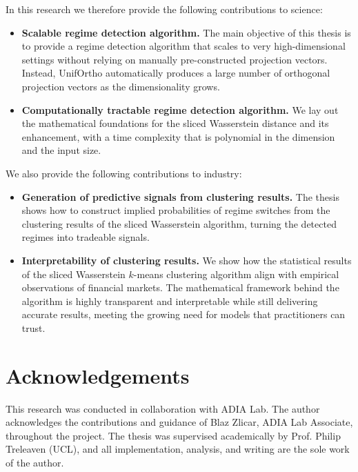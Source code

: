 \documentclass[12pt,a4paper]{report}
\begin{document}
In this research we therefore provide the following contributions to science:
\begin{itemize}
  \item \textbf{Scalable regime detection algorithm.} The main objective of this
  thesis is to provide a regime detection algorithm that scales to very
  high-dimensional settings without relying on manually pre-constructed projection
  vectors. Instead, UnifOrtho automatically produces a large number of orthogonal
  projection vectors as the dimensionality grows.

  \item \textbf{Computationally tractable regime detection algorithm.} We lay out
  the mathematical foundations for the sliced Wasserstein distance and its
  enhancement, with a time complexity that is polynomial in the dimension and the
  input size.
\end{itemize}

We also provide the following contributions to industry:
\begin{itemize}
  \item \textbf{Generation of predictive signals from clustering results.} The
  thesis shows how to construct implied probabilities of regime switches from the
  clustering results of the sliced Wasserstein algorithm, turning the detected
  regimes into tradeable signals.

  \item \textbf{Interpretability of clustering results.} We show how the statistical
  results of the sliced Wasserstein $k$-means clustering algorithm align with
  empirical observations of financial markets. The mathematical framework behind the
  algorithm is highly transparent and interpretable while still delivering accurate
  results, meeting the growing need for models that practitioners can trust.
\end{itemize}


\newpage
\chapter*{Acknowledgements}
This research was conducted in collaboration with ADIA Lab. The author acknowledges the contributions and guidance of Blaz Zlicar, ADIA Lab Associate, throughout the project. The thesis was supervised academically by Prof. Philip Treleaven (UCL), and all implementation, analysis, and writing are the sole work of the author.


\newpage
\tableofcontents
\newpage
\end{document}
